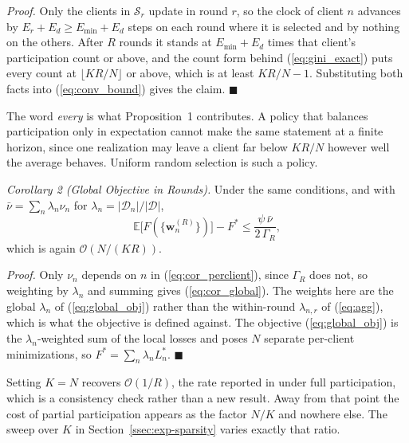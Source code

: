 \documentclass[journal]{IEEEtran}
\newcommand{\rev}[1]{{\color{blue}#1}}
\begin{document}
\rev{\textit{Proof.} Only the clients in $\mathcal{S}_r$ update in round $r$, so the clock of client $n$ advances by $E_r + E_d \ge E_{\min} + E_d$ steps on each round where it is selected and by nothing on the others. After $R$ rounds it stands at $E_{\min}+E_d$ times that client's participation count or above, and the count form behind (\ref{eq:gini_exact}) puts every count at $\lfloor KR/N \rfloor$ or above, which is at least $KR/N - 1$. Substituting both facts into (\ref{eq:conv_bound}) gives the claim. \hfill$\blacksquare$}

\rev{The word \emph{every} is what Proposition~1 contributes. A policy that balances participation only in expectation cannot make the same statement at a finite horizon, since one realization may leave a client far below $KR/N$ however well the average behaves. Uniform random selection is such a policy.}

\rev{\textit{Corollary 2 (Global Objective in Rounds).} Under the same conditions, and with $\bar{\nu} = \sum_{n} \lambda_n \nu_n$ for $\lambda_n = |\mathcal{D}_n| / |\mathcal{D}|$,}
\begin{equation}
\mathbb{E}\bigl[F(\{\bm{w}_n^{(R)}\})\bigr] - F^{*} \le \frac{\psi\, \bar{\nu}}{2\,\Gamma_R},
\label{eq:cor_global}
\end{equation}
\rev{which is again $\mathcal{O}(N/(KR))$.}

\rev{\textit{Proof.} Only $\nu_n$ depends on $n$ in (\ref{eq:cor_perclient}), since $\Gamma_R$ does not, so weighting by $\lambda_n$ and summing gives (\ref{eq:cor_global}). The weights here are the global $\lambda_n$ of (\ref{eq:global_obj}) rather than the within-round $\lambda_{n,r}$ of (\ref{eq:agg}), which is what the objective is defined against. The objective (\ref{eq:global_obj}) is the $\lambda_n$-weighted sum of the local losses and \cite{mu2024fedtskd} poses $N$ separate per-client minimizations, so $F^{*} = \sum_n \lambda_n L_n^{*}$. \hfill$\blacksquare$}

\rev{Setting $K = N$ recovers $\mathcal{O}(1/R)$, the rate reported in \cite{mu2024fedtskd} under full participation, which is a consistency check rather than a new result. Away from that point the cost of partial participation appears as the factor $N/K$ and nowhere else. The sweep over $K$ in Section~\ref{ssec:exp-sparsity} varies exactly that ratio.}
\end{document}
